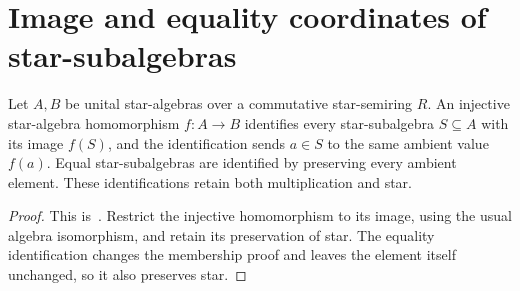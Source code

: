 \section{Image and equality coordinates of star-subalgebras}
\label{sec:qca_star_subalgebra_coordinates}

\begin{lemma}
    \label{lem:star_subalgebra_coordinate_equivalences}
    \leanok
    Let $A,B$ be unital star-algebras over a commutative star-semiring
    $R$. An injective star-algebra homomorphism $f:A\to B$ identifies
    every star-subalgebra $S\subseteq A$ with its image $f(S)$, and the
    identification sends $a\in S$ to the same ambient value $f(a)$.
    Equal star-subalgebras are identified by preserving every ambient
    element. These identifications retain both multiplication and star.
\end{lemma}
\begin{proof}
    \leanok
    This is~\cite[``Coordinate identifications preserve ambient
        values'']{QICLean2026Blueprint}.
    Restrict the injective homomorphism to its image, using the usual
    algebra isomorphism, and retain its preservation of star. The equality
    identification changes the membership proof and leaves the element
    itself unchanged, so it also preserves star.
\end{proof}
